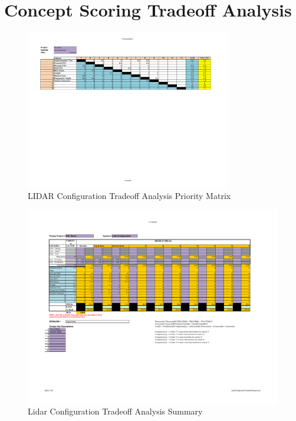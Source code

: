 \appendixpagenumbering
\chapter{Concept Scoring Tradeoff Analysis} \label{App:tradeoff}

\begin{figure}[H]
\includegraphics[angle=90,width=0.8\textwidth]{TradeoffAnalysis/LIDAR1.pdf}
\caption[]{LIDAR Configuration Tradeoff Analysis Priority Matrix}
\label{fig:lidartradeoff1}
\end{figure}

\begin{figure}[H]
\includegraphics[angle=90,width=\textwidth]{TradeoffAnalysis/LIDAR2.pdf} 
\caption[]{Lidar Configuration Tradeoff Analysis Summary}
\label{fig:lidartradeoff}
\end{figure}

